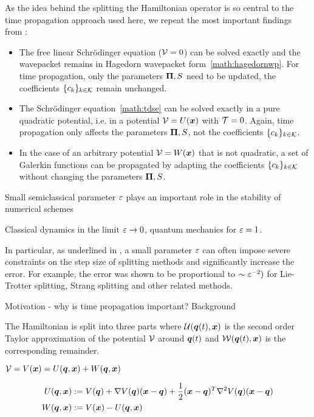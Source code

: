 As the idea behind the splitting the Hamiltonian operator is so central to the time propagation approach used here, we repeat the most important findings from  \cite{FGL_semiclassical_dynamics}:
\begin{itemize}
	\item The free linear Schrödinger equation ($\mathcal{V}=0$) can be solved exactly and the wavepacket remains in Hagedorn wavepacket form~\ref{math:hagedornwp}.
		For time propagation, only the parameters $\bm{\Pi},S$ need to be updated, the coefficients $\{c_k\}_{k \in \mathcal{K}}$ remain unchanged.
	\item The Schrödinger equation~\ref{math:tdse} can be solved exactly in a pure quadratic potential, i.e. in a potential $\mathcal{V}=U(\bm{x})$ with $\mathcal{T}=0$.
		Again, time propagation only affects the parameters $\bm{\Pi},S$, not the coefficients $\{c_k\}_{k \in \mathcal{K}}$.
	\item In the case of an arbitrary potential $\mathcal{V} = W(\bm{x})$ that is not quadratic, a set of Galerkin functions can be propagated by adapting the coefficients $\{c_k\}_{k \in \mathcal{K}}$ without changing the parameters $\bm{\Pi},S$.
\end{itemize}

	
Small semiclassical parameter $\varepsilon$ plays an important role in the stability of numerical schemes

Classical dynamics in the limit $\varepsilon \rightarrow 0$, quantum mechanics for $\varepsilon = 1$.

In particular, as underlined in \cite{GH_convsemiclassical}, a small parameter $\varepsilon$ can often impose severe constraints on the step size of splitting methods and significantly increase the error. For example, the error was shown to be proportional to $\sim \varepsilon^{-2})$ for Lie-Trotter splitting, Strang splitting and other related methods.

Motivation - why is time propagation important?
Background


The Hamiltonian is split into three parts
where $\mathcal{U}(\bm{q}(t),\bm{x})$ is the second order Taylor approximation of the potential $\mathcal{V}$ around $\bm{q}(t)$ and $\mathcal{W}(\bm{q}(t),\bm{x})$ is the corresponding remainder.

$\mathcal{V} = V(\bm{x}) = U(\bm{q},\bm{x}) + W(\bm{q},\bm{x})$

\begin{align}
	U(\bm{q},\bm{x}) &:= V(\bm{q}) + \nabla V(\bm{q}) (\bm{x}-\bm{q})
	+ \frac{1}{2} (\bm{x}-\bm{q})^T \nabla^2 V(\bm{q}) (\bm{x}-\bm{q}) \\
	W(\bm{q},\bm{x}) &:= V(\bm{x}) - U(\bm{q},\bm{x})
\end{align}

